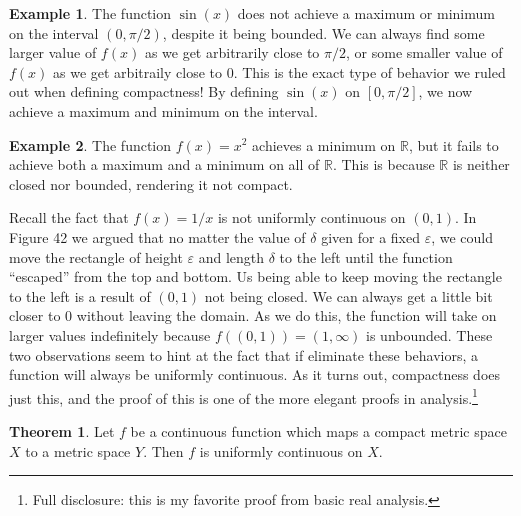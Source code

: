 \documentclass{article}
\newcommand{\R}{\mathbb{R}}
\theoremstyle{definition}
\newtheorem{theorem}{Theorem}[section]
\newtheorem{example}{Example}[section]
\begin{document}
\begin{example}
	The function $ \sin(x) $ does not achieve a maximum or minimum on the interval $ (0,\pi/2) $, despite it being bounded. We can always find some larger value of $ f(x) $ as we get arbitrarily close to $ \pi/2 $, or some smaller value of $ f(x) $ as we get arbitraily close to $ 0 $. This is the exact type of behavior we ruled out when defining compactness! By defining $ \sin(x) $ on $ [0,\pi/2] $, we now achieve a maximum and minimum on the interval.  
\end{example}
\begin{example}
	The function $ f(x)=x^2 $ achieves a minimum on $ \R $, but it fails to achieve both a maximum and a minimum on all of $ \R $. This is because $ \R $ is neither closed nor bounded, rendering it not compact. 
\end{example}
Recall the fact that $ f(x)=1/x $ is not uniformly continuous on $ (0,1) $. In Figure 42 we argued that no matter the value of $ \delta $ given for a fixed $ \varepsilon $, we could move the rectangle of height $ \varepsilon $ and length $ \delta $ to the left until the function ``escaped'' from the top and bottom. Us being able to keep moving the rectangle to the left is a result of $ (0,1) $ not being closed. We can always get a little bit closer to $ 0 $ without leaving the domain. As we do this, the function will take on larger values indefinitely because $ f((0,1))=(1,\infty) $ is unbounded. These two observations seem to hint at the fact that if eliminate these behaviors, a function will always be uniformly continuous. As it turns out, compactness does just this, and the proof of this is one of the more elegant proofs in analysis.\footnote{Full disclosure: this is my favorite proof from basic real analysis.} 
\begin{theorem}
	Let $ f $ be a continuous function which maps a compact metric space $ X $ to a metric space $ Y $. Then $ f $ is uniformly continuous on $ X $.
\end{theorem}
\end{document}
